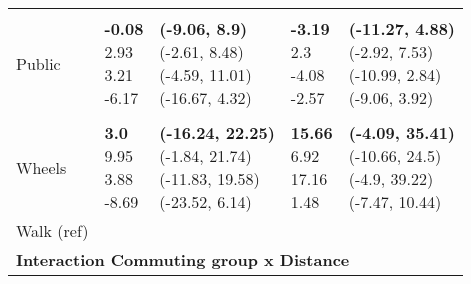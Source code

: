 \begin{table}
\begin{center}
\begin{small}
\begin{tabular}{lllll}
& & & & \\ 
\quad Public    &  \makecell[l]{\textbf{-0.08} \\2.93 \\3.21 \\-6.17 \\}   &  \makecell[l]{\textbf{(-9.06, 8.9)} \\(-2.61, 8.48) \\(-4.59, 11.01) \\(-16.67, 4.32) \\}   &  \makecell[l]{\textbf{-3.19} \\2.3 \\-4.08 \\-2.57 \\}   &  \makecell[l]{\textbf{(-11.27, 4.88)} \\(-2.92, 7.53) \\(-10.99, 2.84) \\(-9.06, 3.92) \\} \\ 
& & & & \\ 
\quad Wheels    &  \makecell[l]{\textbf{3.0} \\9.95 \\3.88 \\-8.69 \\}   &  \makecell[l]{\textbf{(-16.24, 22.25)} \\(-1.84, 21.74) \\(-11.83, 19.58) \\(-23.52, 6.14) \\}   &  \makecell[l]{\textbf{15.66} \\6.92 \\17.16 \\1.48 \\}   &  \makecell[l]{\textbf{(-4.09, 35.41)} \\(-10.66, 24.5) \\(-4.9, 39.22) \\(-7.47, 10.44) \\} \\ 
\quad Walk (ref) & & & & \\ 
\multicolumn{5}{l}{\textbf{Interaction Commuting group x Distance}} \\ 

\end{tabular}
\end{small}
\end{center}
\end{table}
